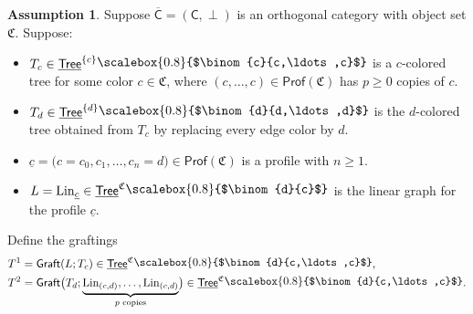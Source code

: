 \documentclass{amsbook}
\numberwithin{section}{chapter}
\numberwithin{subsection}{section}
\numberwithin{equation}{section}
\theoremstyle{plain}
\theoremstyle{definition}
\newtheorem{assumption}[equation]{Assumption}
\newcommand{\colorc}{\mathfrak{C}}
\newcommand{\graft}{\mathsf{Graft}}
\newcommand{\Lin}{\mathrm{Lin}}
\newcommand{\Prof}{\mathsf{Prof}}
\newcommand{\Profc}{\Prof(\colorc)}
\newcommand{\C}{\mathsf{C}}
\newcommand{\Cbar}{\overline{\C}}
\newcommand{\Tree}{\mathsf{Tree}}
\newcommand{\uTree}{\underline{\Tree}}
\newcommand{\uTreec}{\uTree^{\colorc}}
\newcommand{\uc}{\underline c}
\newcommand{\smallprof}[1]
{\raisebox{.05cm}{\scalebox{0.8}{#1}}}
\newcommand{\ccc}{\smallprof{$\binom{c}{c,\ldots,c}$}}
\newcommand{\dc}{\smallprof{$\binom{d}{c}$}}
\newcommand{\dcc}{\smallprof{$\binom{d}{c,\ldots,c}$}}
\newcommand{\ddd}{\smallprof{$\binom{d}{d,\ldots,d}$}}
\begin{document}
\begin{assumption}\label{assumption:hcdiag-ainfinity}
Suppose $\Cbar = (\C,\perp)$ is an orthogonal category with object set $\colorc$.  Suppose:
\begin{itemize}\item $T_c \in \uTree^{\{c\}}\ccc$ is a $c$-colored tree for some color $c \in \colorc$, where $(c,\ldots,c) \in \Profc$ has $p \geq 0$ copies of $c$.  
\item $T_d \in \uTree^{\{d\}}\ddd$ is the $d$-colored tree obtained from $T_c$ by replacing every edge color by $d$.  
\item $\uc=\bigl(c=c_0,c_1,\ldots,c_n=d\bigr) \in \Profc$ is a profile with $n \geq 1$.
\item $L = \Lin_{\uc} \in \uTreec\dc$ is the linear graph for the profile $\uc$.  
\end{itemize}
Define the graftings \[\begin{split}T^1 &= \graft(L;T_c) \in \uTreec\dcc,\\
T^2 &= \graft\bigl(T_d;\underbrace{\Lin_{(c,d)},\ldots,\Lin_{(c,d)}}_{\text{$p$ copies}}\bigr) \in \uTreec\dcc.\end{split}\]


\end{assumption}
\end{document}
